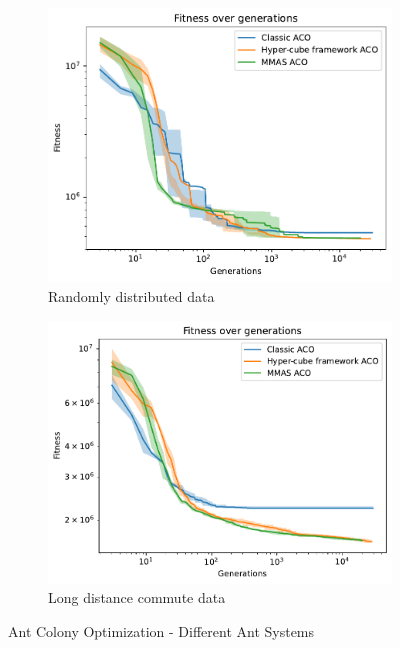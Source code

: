 \begin{figure}
    \centering
    \begin{subfigure}[b]{0.45\textwidth}
        \includegraphics[width=\textwidth]{img/aco_compareas_random.pdf}
        \caption{Randomly distributed data}
        \label{fig:aco_as_random}
    \end{subfigure}
    \begin{subfigure}[b]{0.45\textwidth}
        \includegraphics[width=\textwidth]{img/aco_compareas_commute.pdf}
        \caption{Long distance commute data}
        \label{fig:aco_as_commute}
    \end{subfigure}
    \caption{Ant Colony Optimization - Different Ant Systems}
    \label{fig:aco_ant_systems}
\end{figure}